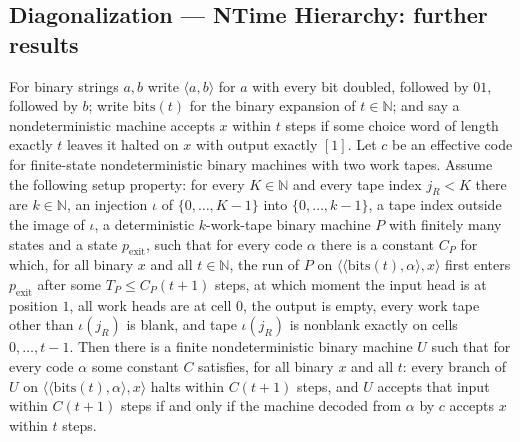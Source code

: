 \subsection*{Diagonalization --- NTime Hierarchy: further results}

\begin{theorem}
\label{Turing.un_universal_of_setup}
\leanok
{}
For binary strings $a,b$ write $\langle a,b\rangle$ for $a$ with every bit doubled, followed by
$01$, followed by $b$; write $\mathrm{bits}(t)$ for the binary expansion of $t\in\mathbb{N}$; and
say a nondeterministic machine accepts $x$ within $t$ steps if some choice word of length exactly
$t$ leaves it halted on $x$ with output exactly $[1]$. Let $c$ be an effective code for
finite-state nondeterministic binary machines with two work tapes. Assume the following setup
property: for every $K\in\mathbb{N}$ and every tape index
$j_R<K$ there are $k\in\mathbb{N}$, an injection $\iota$ of $\{0,\dots,K-1\}$ into
$\{0,\dots,k-1\}$, a tape index outside the image of $\iota$, a deterministic $k$-work-tape
binary machine $P$ with finitely many states and a state $p_{\mathrm{exit}}$, such that for
every code $\alpha$ there is a constant $C_P$ for which, for all binary $x$ and all
$t\in\mathbb{N}$, the run of $P$ on $\langle\langle\mathrm{bits}(t),\alpha\rangle,x\rangle$
first enters $p_{\mathrm{exit}}$ after some $T_P\le C_P(t+1)$ steps, at which moment the input
head is at position $1$, all work heads are at cell $0$, the output is empty, every work tape
other than $\iota(j_R)$ is blank, and tape $\iota(j_R)$ is nonblank exactly on cells
$0,\dots,t-1$. Then there is a finite nondeterministic binary machine $U$ such that for every
code $\alpha$ some constant $C$ satisfies, for all binary $x$ and all $t$: every branch of $U$ on
$\langle\langle\mathrm{bits}(t),\alpha\rangle,x\rangle$ halts within $C(t+1)$ steps, and $U$
accepts that input within $C(t+1)$ steps if and only if the machine decoded from $\alpha$ by $c$
accepts $x$ within $t$ steps.
\end{theorem}

